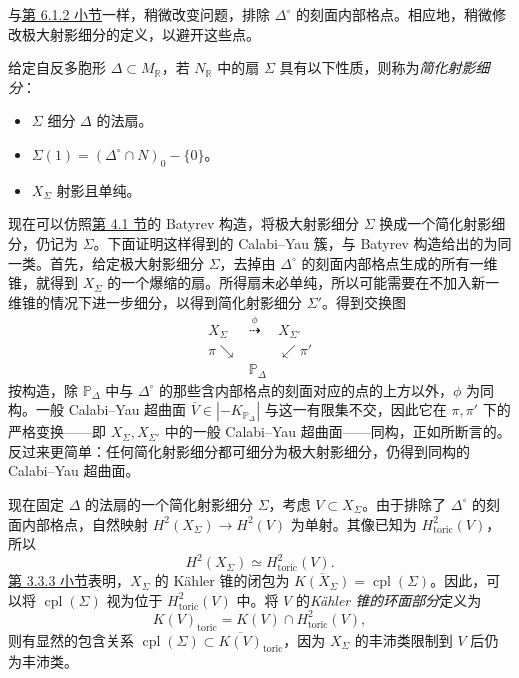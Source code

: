 与\hyperref[subsec:toric-complex-moduli]{第 6.1.2 小节}一样，稍微改变问题，排除 $\Delta^\circ$ 的刻面内部格点。相应地，稍微修改极大射影细分的定义，以避开这些点。
\begin{definition}\label{def:simplified-projective-subdivision}
给定自反多胞形 $\Delta\subset M_{\mathbb R}$，若 $N_{\mathbb R}$ 中的扇 $\Sigma$ 具有以下性质，则称为\emph{简化射影细分}：
\begin{itemize}
\item $\Sigma$ 细分 $\Delta$ 的法扇。
\item $\Sigma(1)=(\Delta^\circ\cap N)_0-\{0\}$。
\item $X_\Sigma$ 射影且单纯。
\end{itemize}
\end{definition}
现在可以仿照\hyperref[sec:batyrev-mirror]{第 4.1 节}的 Batyrev 构造，将极大射影细分 $\Sigma$ 换成一个简化射影细分，仍记为 $\Sigma$。下面证明这样得到的 Calabi--Yau 簇，与 Batyrev 构造给出的为同一类。首先，给定极大射影细分 $\Sigma$，去掉由 $\Delta^\circ$ 的刻面内部格点生成的所有一维锥，就得到 $X_\Sigma$ 的一个爆缩的扇。所得扇未必单纯，所以可能需要在不加入新一维锥的情况下进一步细分，以得到简化射影细分 $\Sigma'$。得到交换图
\begin{equation}\label{eq:simplified-subdivision-diagram}
\begin{array}{ccc}
X_\Sigma&\overset{\phi}{\dashrightarrow}&X_{\Sigma'}\\
\scriptstyle\pi\searrow&&\swarrow\scriptstyle\pi'\\
&\mathbb P_\Delta&
\end{array}
\end{equation}
按构造，除 $\mathbb P_\Delta$ 中与 $\Delta^\circ$ 的那些含内部格点的刻面对应的点的上方以外，$\phi$ 为同构。一般 Calabi--Yau 超曲面 $\overline V\in|-K_{\mathbb P_\Delta}|$ 与这一有限集不交，因此它在 $\pi,\pi'$ 下的严格变换——即 $X_\Sigma,X_{\Sigma'}$ 中的一般 Calabi--Yau 超曲面——同构，正如所断言的。反过来更简单：任何简化射影细分都可细分为极大射影细分，仍得到同构的 Calabi--Yau 超曲面。

现在固定 $\Delta$ 的法扇的一个简化射影细分 $\Sigma$，考虑 $V\subset X_\Sigma$。由于排除了 $\Delta^\circ$ 的刻面内部格点，自然映射 $H^2(X_\Sigma)\to H^2(V)$ 为单射。其像已知为 $H_{\mathrm{toric}}^2(V)$，所以
\[
H^2(X_\Sigma)\simeq H_{\mathrm{toric}}^2(V).
\]
\hyperref[subsec:toric-kahler-cone]{第 3.3.3 小节}表明，$X_\Sigma$ 的 Kähler 锥的闭包为 $\overline{K(X_\Sigma)}=\operatorname{cpl}(\Sigma)$。因此，可以将 $\operatorname{cpl}(\Sigma)$ 视为位于 $H_{\mathrm{toric}}^2(V)$ 中。将 $V$ 的\emph{Kähler 锥的环面部分}定义为
\[
K(V)_{\mathrm{toric}}=K(V)\cap H_{\mathrm{toric}}^2(V),
\]
则有显然的包含关系 $\operatorname{cpl}(\Sigma)\subset\overline{K(V)}_{\mathrm{toric}}$，因为 $X_\Sigma$ 的丰沛类限制到 $V$ 后仍为丰沛类。

